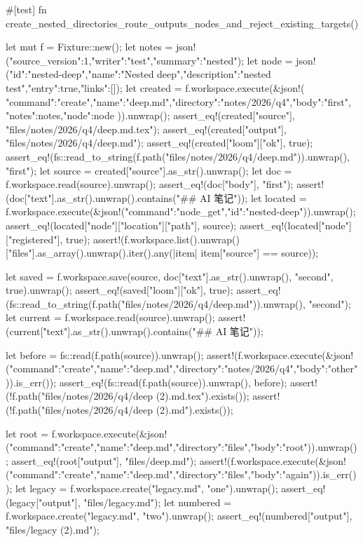 #[test]
fn create_nested_directories_route_outputs_nodes_and_reject_existing_targets() {
    let mut f = Fixture::new();
    let notes = json!({"source_version":1,"writer":"test","summary":"nested"});
    let node = json!({"id":"nested-deep","name":"Nested deep","description":"nested test","entry":true,"links":[]});
    let created = f.workspace.execute(&json!({
        "command":"create","name":"deep.md","directory":"notes/2026/q4","body":"first\n",
        "notes":notes,"node":node
    })).unwrap();
    assert_eq!(created["source"], "files/notes/2026/q4/deep.md.tex");
    assert_eq!(created["output"], "files/notes/2026/q4/deep.md");
    assert_eq!(created["loom"]["ok"], true);
    assert_eq!(fs::read_to_string(f.path("files/notes/2026/q4/deep.md")).unwrap(), "first\n");
    let source = created["source"].as_str().unwrap();
    let doc = f.workspace.read(source).unwrap();
    assert_eq!(doc["body"], "first\n");
    assert!(doc["text"].as_str().unwrap().contains("## AI 笔记"));
    let located = f.workspace.execute(&json!({"command":"node_get","id":"nested-deep"})).unwrap();
    assert_eq!(located["node"]["location"]["path"], source);
    assert_eq!(located["node"]["registered"], true);
    assert!(f.workspace.list().unwrap()["files"].as_array().unwrap().iter().any(|item| item["source"] == source));

    let saved = f.workspace.save(source, doc["text"].as_str().unwrap(), "second\n", true).unwrap();
    assert_eq!(saved["loom"]["ok"], true);
    assert_eq!(fs::read_to_string(f.path("files/notes/2026/q4/deep.md")).unwrap(), "second\n");
    let current = f.workspace.read(source).unwrap();
    assert!(current["text"].as_str().unwrap().contains("## AI 笔记"));

    let before = fs::read(f.path(source)).unwrap();
    assert!(f.workspace.execute(&json!({"command":"create","name":"deep.md","directory":"notes/2026/q4","body":"other\n"})).is_err());
    assert_eq!(fs::read(f.path(source)).unwrap(), before);
    assert!(!f.path("files/notes/2026/q4/deep (2).md.tex").exists());
    assert!(!f.path("files/notes/2026/q4/deep (2).md").exists());

    let root = f.workspace.execute(&json!({"command":"create","name":"deep.md","directory":"files","body":"root\n"})).unwrap();
    assert_eq!(root["output"], "files/deep.md");
    assert!(f.workspace.execute(&json!({"command":"create","name":"deep.md","directory":"files","body":"again"})).is_err());
    let legacy = f.workspace.create("legacy.md", "one").unwrap();
    assert_eq!(legacy["output"], "files/legacy.md");
    let numbered = f.workspace.create("legacy.md", "two").unwrap();
    assert_eq!(numbered["output"], "files/legacy (2).md");

}
